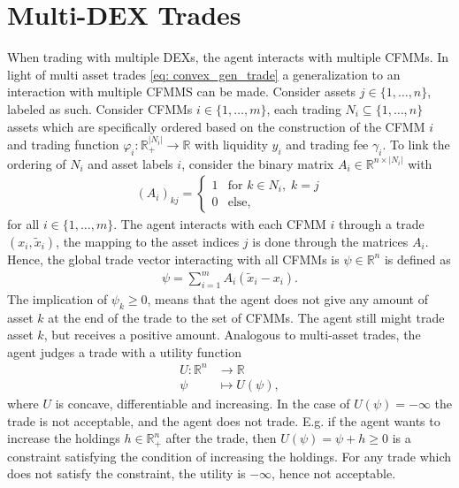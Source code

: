 \section{Multi-DEX Trades}
When trading with multiple DEXs, the agent interacts with multiple CFMMs. In
light of multi asset trades \ref{eq: convex_gen_trade} a generalization to an
interaction with multiple CFMMS can be made. Consider assets $j \in \{1,
\ldots,n\}$, labeled as such. Consider CFMMs $i \in \{1,\ldots,m\}$, each
trading $N_i \subseteq \{1,\ldots,n\}  $ assets which are specifically
ordered based on the construction of the CFMM $i$ and trading function
$\varphi_i: \mathbb{R}^{|N_i|}_+\to \mathbb{R}$ with liquidity $y_i$ and
trading fee $\gamma_i$. To link the ordering of $N_i$ and asset labels $i$,
consider the binary matrix $A_i \in \mathbb{R}^{n\times |N_i|}$ with
\begin{align}
    (A_i)_{kj} =
    \begin{cases}
        1 & \text{for } k \in N_i, \; k = j \\
        0 & \text{else},
        \end{cases}
\end{align}
for all $i \in \{1,\ldots,m\} $.
The agent interacts with each CFMM $i$ through a trade $(x_i, \tilde{x}_i)$, the
mapping to the asset indices $j$ is done through the matrices $A_i$. Hence,
the global trade vector interacting with all CFMMs is $\psi \in
\mathbb{R}^{n}$ is defined as
\begin{align}
    \psi = \sum_{i=1}^{m} A_i(\tilde{x}_i-x_i).
\end{align}
The implication of $\psi_k \ge 0$, means that the agent does not give any
amount of asset $k$ at the end of the trade to the set of CFMMs. The agent
still might trade asset $k$, but receives a positive amount. Analogous to
multi-asset trades, the agent judges a trade with a utility function
\begin{align}
    U:\mathbb{R}^{n}&\to\mathbb{R}\\
    \psi &\mapsto U(\psi),
\end{align}
where $U$ is concave, differentiable and increasing. In the case of $U(\psi)
= -\infty$ the trade is not acceptable, and the agent does not trade. E.g. if
the agent wants to increase the holdings $h\in \mathbb{R}_+^{n}$ after the
trade, then $U(\psi) = \psi + h \ge 0$ is a constraint satisfying the
condition of increasing the holdings. For any trade which does not satisfy
the constraint, the utility is $-\infty$, hence not acceptable.
\newline

